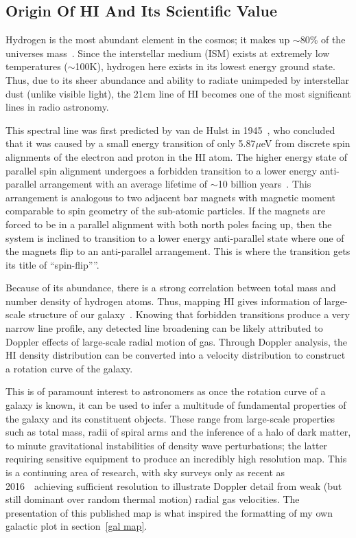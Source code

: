 \documentclass[11pt]{article} %
\begin{document}
\subsection{Origin Of HI And Its Scientific Value} \label{theory}


Hydrogen is the most abundant element in the cosmos; it makes up $\sim$80\% of the universe\textquotesingle s mass~\cite{5}. Since the interstellar medium (ISM) exists at extremely low temperatures ($\sim$100K), hydrogen here exists in its lowest energy ground state. Thus, due to its sheer abundance and ability to radiate unimpeded by interstellar dust (unlike visible light), the 21cm  line of HI becomes one of the most significant lines in radio astronomy.

This spectral line was first predicted by van de Hulst in 1945~\cite{8}, who concluded that it was caused by a small energy transition of only 5.87$\mu$eV from discrete spin alignments of the electron and proton in the HI atom. The higher energy state of parallel spin alignment undergoes a forbidden transition to a lower energy anti-parallel arrangement with an average lifetime of $\sim$10 billion years~\cite{6}. This arrangement is analogous to two adjacent bar magnets with magnetic moment comparable to spin geometry of the sub-atomic particles. If the magnets are forced to be in a parallel alignment with both north poles facing up, then the system is inclined to transition to a lower energy anti-parallel state where one of the magnets flip to an anti-parallel arrangement. This is where the transition gets its title of \textquotedblleft spin-flip\textquotedblright”.

Because of its abundance, there is a strong correlation between total mass and number density of hydrogen atoms. Thus, mapping HI gives information of large-scale structure of our galaxy~\cite{1}. Knowing that forbidden transitions produce a very narrow line profile, any detected line broadening can be likely attributed to Doppler effects of large-scale radial motion of gas. Through Doppler analysis, the HI density distribution can be converted into a velocity distribution to construct a rotation curve of the galaxy.

This is of paramount interest to astronomers as once the rotation curve of a galaxy is known, it can be used to infer a multitude of fundamental properties of the galaxy and its constituent objects. These range from large-scale properties such as total mass, radii of spiral arms and the inference of a halo of dark matter, to minute gravitational instabilities of density wave perturbations; the latter requiring sensitive equipment to produce an incredibly high resolution map. This is a continuing area of research, with sky surveys only as recent as 2016~\cite{8}~achieving sufficient resolution to illustrate Doppler detail from weak (but still dominant over random thermal motion) radial gas velocities. The presentation of this published map is what inspired the formatting of my own galactic plot in section~\ref{gal map}.
\end{document}
